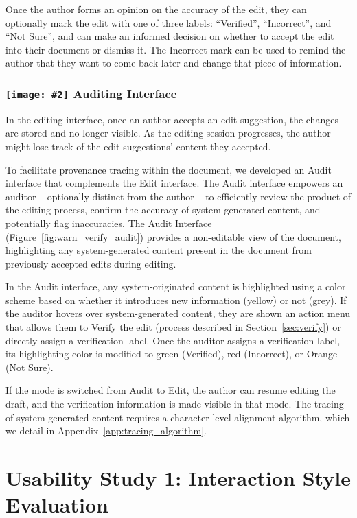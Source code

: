 \documentclass[manuscript]{acmart}
\newcommand{\symbolimg}[2][0.4cm]{%
  \texttt{[image: \#2]}%
}
\begin{document}
Once the author forms an opinion on the accuracy of the edit, they can optionally mark the edit with one of three labels: ``Verified'', ``Incorrect'', and ``Not Sure'', and can make an informed decision on whether to accept the edit into their document or dismiss it. The Incorrect mark can be used to remind the author that they want to come back later and change that piece of information.

\subsubsection{\symbolimg{figures/icons/audit.png} Auditing Interface} \label{sec:auditing_interface}

In the editing interface, once an author accepts an edit suggestion, the changes are stored and no longer visible. As the editing session progresses, the author might lose track of the edit suggestions' content they accepted.

To facilitate provenance tracing within the document, we developed an Audit interface that complements the Edit interface. The Audit interface empowers an auditor -- optionally distinct from the author -- to efficiently review the product of the editing process, confirm the accuracy of system-generated content, and potentially flag inaccuracies. The Audit Interface (Figure~\ref{fig:warn_verify_audit}) provides a non-editable view of the document, highlighting any system-generated content present in the document from previously accepted edits during editing.

In the Audit interface, any system-originated content is highlighted using a color scheme based on whether it introduces new information (yellow) or not (grey). If the auditor hovers over system-generated content, they are shown an action menu that allows them to Verify the edit (process described in Section~\ref{sec:verify}) or directly assign a verification label. Once the auditor assigns a verification label, its highlighting color is modified to green (Verified), red (Incorrect), or Orange (Not Sure).

If the mode is switched from Audit to Edit, the author can resume editing the draft, and the verification information is made visible in that mode. The tracing of system-generated content requires a character-level alignment algorithm, which we detail in Appendix~\ref{app:tracing_algorithm}.

\section{Usability Study 1: Interaction Style Evaluation} \label{sec:study1}
\end{document}
